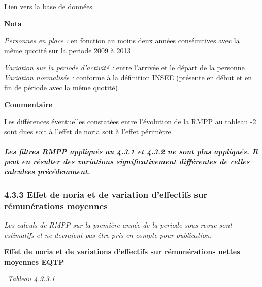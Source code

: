 \href{../Bases/Remunerations/Anavar.synthese.csv}{Lien vers la base de
données}

\textbf{Nota}

\emph{Personnes en place :} en fonction au moins deux années
consécutives avec la même quotité sur la periode 2009 à 2013

\emph{Variation sur la periode d'activité :} entre l'arrivée et le
départ de la personne\\
\emph{Variation normalisée :} conforme à la définition INSEE (présente
en début et en fin de période avec la même quotité)

\textbf{Commentaire}

Les différences éventuelles constatées entre l'évolution de la RMPP au
tableau -2 sont dues soit à l'effet de noria soit à l'effet périmètre.

\hypertarget{les-filtres-rmpp-appliques-au-4.3.1-et-4.3.2-ne-sont-plus-appliques.-il-peut-en-resulter-des-variations-significativement-differentes-de-celles-calculees-precedemment.}{%
\subparagraph{Les filtres RMPP appliqués au 4.3.1 et 4.3.2 ne sont plus
appliqués. Il peut en résulter des variations significativement
différentes de celles calculees
précédemment.}\label{les-filtres-rmpp-appliques-au-4.3.1-et-4.3.2-ne-sont-plus-appliques.-il-peut-en-resulter-des-variations-significativement-differentes-de-celles-calculees-precedemment.}}

\hypertarget{effet-de-noria-et-de-variation-deffectifs-sur-remunerations-moyennes}{%
\subsubsection{4.3.3 Effet de noria et de variation d'effectifs sur
rémunérations
moyennes}\label{effet-de-noria-et-de-variation-deffectifs-sur-remunerations-moyennes}}

\emph{Les calculs de RMPP sur la première année de la periode sous revue
sont estimatifs et ne devraient pas être pris en compte pour
publication.}

\textbf{Effet de noria et de variations d'effectifs sur rémunérations
nettes moyennes EQTP}

~\emph{Tableau 4.3.3.1}

